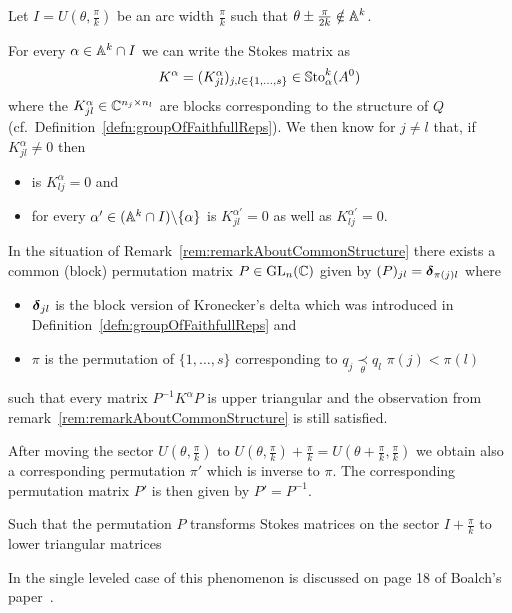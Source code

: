 Let $I=U(\theta,\frac{\pi}{k})$ be an arc width $\frac{\pi}{k}$ such that
$\theta\pm\frac{\pi}{2k}\notin\mathbb{A}^k$.
\begin{rem}\label{rem:remarkAboutCommonStructure}
  For every $\alpha\in\mathbb{A}^k\cap I$ we can write the Stokes matrix as
  \[
    K^\alpha=(K^\alpha_{jl})_{j,l\in\{1,\dots,s\}}\in\operatorname{\mathbb{S}to}_\alpha^k(A^0)
  \]
  where the $K^\alpha_{jl}\in\mathbb{C}^{n_j\times n_l}$ are blocks corresponding to
  the structure of $Q$ (cf.\ Definition~\ref{defn:groupOfFaithfullReps}).
  We then know for $j\neq l$ that, if $K^\alpha_{jl}\neq0$ then
  \begin{itemize}
    \item is $K^\alpha_{lj}=0$ and
    \item for every $\alpha'\in(\mathbb{A}^k\cap I)\backslash\{\alpha\}$ is
      $K^{\alpha'}_{jl}=0$ as well as $K^{\alpha'}_{lj}=0$.
  \end{itemize}
\end{rem}
\begin{rem}
  In the situation of Remark~\ref{rem:remarkAboutCommonStructure}
  there exists a common (block) permutation matrix $P\in\operatorname{GL}_n(\mathbb{C})$ given by
  $(P)_{jl}=\boldsymbol{\delta}_{\pi(j)l}$ where
  \begin{itemize}
    \item $\boldsymbol{\delta}_{jl}$ is the block version of Kronecker's delta
      which was introduced in Definition~\ref{defn:groupOfFaithfullReps} and
    \item $\pi$ is the permutation of $\{1,\dots,s\}$ corresponding to
      $q_j\underset{\theta}{\prec}q_l$ \Leftrightarrow{} $\pi(j)<\pi(l)$
  \end{itemize}
  such that every matrix $P^{-1}K^{\alpha}P$ is upper triangular and the
  observation from remark~\ref{rem:remarkAboutCommonStructure} is still
  satisfied.
  \begin{s-rem}
    After moving the sector $U(\theta,\frac{\pi}{k})$ to
    $U(\theta,\frac{\pi}{k})+\frac{\pi}{k}
    =U(\theta+\frac{\pi}{k},\frac{\pi}{k})$ we obtain also a corresponding
    permutation $\pi'$ which is inverse to $\pi$.
    The corresponding permutation matrix $P'$ is then given by $P'=P^{-1}$.

    Such that the permutation $P$ transforms Stokes matrices on the sector
    $I+\frac{\pi}{k}$ to lower triangular matrices
  \end{s-rem}
  In the single leveled case of this phenomenon is discussed on page 18 of
  Boalch's paper~\cite{boalch}.
\end{rem}

